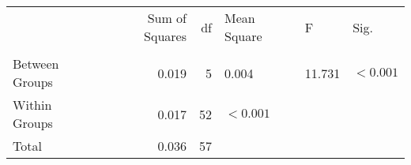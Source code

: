 \begin{tabular}{lrrlll}
\toprule
 & Sum of Squares & df & Mean Square & F & Sig. \\
 &  &  &  &  &  \\
\midrule
Between Groups & 0.019 & 5 & 0.004 & 11.731 & $< 0.001$ \\
Within Groups & 0.017 & 52 & $< 0.001$ &  &  \\
Total & 0.036 & 57 &  &  &  \\
\bottomrule
\end{tabular}

